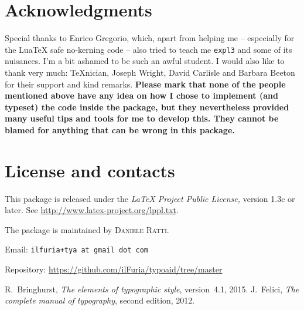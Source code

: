 \documentclass{article}
\begin{document}
\section{Acknowledgments}
Special thanks to Enrico Gregorio, which, apart from helping me -- especially for the Lua\TeX{} safe no-kerning code -- also tried to teach me \texttt{expl3} and some of its nuisances. I’m a bit ashamed to be such an awful student.
I would also like to thank very much: \TeX nician, Joseph Wright, David Carlisle and Barbara Beeton for their support and kind remarks. 
\textbf{Please mark that none of the people mentioned above have any idea on how I chose to implement (and typeset) the code inside the package, but they nevertheless provided many useful tips and tools for me to develop this. They cannot be blamed for anything that can be wrong in this package.}
\section{License and contacts}
This package is released under the \emph{\LaTeX{} Project Public License,} version 1.3c or later. See \url{http://www.latex-project.org/lppl.txt}.\smallskip

The package is maintained by \textsc{Daniele Ratti.} 

Email: \texttt{ilfuria+tya at gmail dot com}

Repository: \url{https://github.com/ilFuria/typoaid/tree/master}

\begin{thebibliography}{9}
 R.~Bringhurst, \emph{The elements of typographic style}, version~4.1, 2015.
 J.~Felici, \emph{The complete manual of typography}, second edition, 2012.
\end{thebibliography}

\printindex
\end{document}
